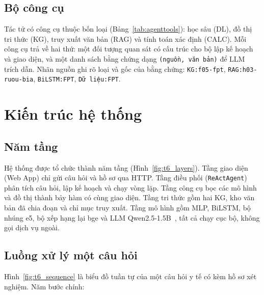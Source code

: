 \subsection{Bộ công cụ}
Tác tử có  công cụ thuộc bốn loại (Bảng~\ref{tab:agenttools}): học sâu (DL), đồ thị tri thức (KG),
truy xuất văn bản (RAG) và tính toán xác định (CALC). Mỗi công cụ trả về hai thứ: một đối tượng quan sát có cấu trúc
cho bộ lập kế hoạch và giao diện, và một danh sách bằng chứng dạng \texttt{(nguồn, văn bản)} để LLM trích dẫn. Nhãn
nguồn ghi rõ loại và gốc của bằng chứng: \texttt{KG:f05-fpt}, \texttt{RAG:h03-ruou-bia}, \texttt{BiLSTM:FPT},
\texttt{Dữ liệu:FPT}.



\section{Kiến trúc hệ thống}\label{sec:kientruc-agent}
\subsection{Năm tầng}
Hệ thống được tổ chức thành năm tầng (Hình~\ref{fig:t6_layers}). Tầng giao diện (Web App) chỉ gửi câu hỏi và hồ sơ
qua HTTP. Tầng điều phối (\texttt{ReActAgent}) phân tích câu hỏi, lập kế hoạch và chạy vòng lặp. Tầng công cụ bọc các
mô hình và đồ thị thành bảy hàm có cùng giao diện. Tầng tri thức gồm hai KG, kho văn bản đã chia đoạn và chỉ mục
truy xuất. Tầng mô hình gồm MLP, BiLSTM, bộ nhúng e5, bộ xếp hạng lại bge và LLM Qwen2.5-1.5B~\cite{qwen2024qwen25},
tất cả chạy cục bộ, không gọi dịch vụ ngoài.


\subsection{Luồng xử lý một câu hỏi}
Hình~\ref{fig:t6_sequence} là biểu đồ tuần tự của một câu hỏi y tế có kèm hồ sơ xét nghiệm. Năm bước chính:

